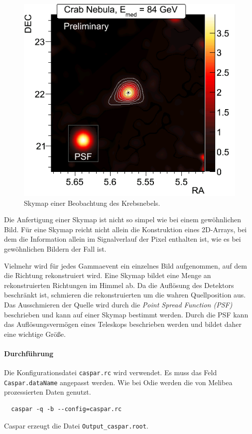 \begin{figure}
  \centering
  \includegraphics[width=\linewidth]{pictures/skymap.png}
  \caption{Skymap einer Beobachtung des Krebsnebels.}%
  \label{fig:skymap}
\end{figure}

Die Anfertigung einer Skymap ist nicht so simpel wie bei einem gewöhnlichen
Bild.
Für eine Skymap reicht nicht allein die Konstruktion eines 2D-Arrays,
bei dem die Information allein im Signalverlauf der Pixel enthalten ist,
wie es bei gewöhnlichen Bildern der Fall ist.

Vielmehr wird für jedes Gammaevent ein einzelnes Bild aufgenommen,
auf dem die Richtung rekonstruiert wird.
Eine Skymap bildet eine Menge an rekonstruierten Richtungen im Himmel ab.
Da die Auflösung des Detektors beschränkt ist,
schmieren die rekonstruierten um die wahren Quellposition aus.
Das Ausschmieren der Quelle wird durch die \textit{Point Spread Function (PSF)}
beschrieben
und kann auf einer Skymap bestimmt werden.
Durch die PSF kann das Auflösungsvermögen eines Teleskops
beschrieben werden und bildet daher eine wichtige Größe.

\paragraph{Durchführung}%

Die Konfigurationsdatei \texttt{caspar.rc} wird verwendet.
Es muss das Feld \texttt{Caspar.dataName} angepasst werden.
Wie bei Odie werden die von Melibea prozessierten Daten genutzt.

\begin{lstlisting}
  caspar -q -b --config=caspar.rc
\end{lstlisting}

Caspar erzeugt die Datei \texttt{Output\_caspar.root}.
